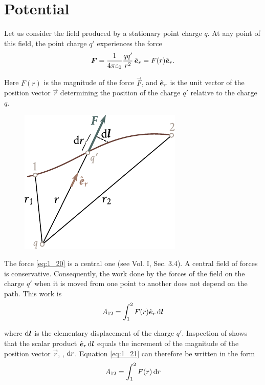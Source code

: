 \section{Potential}\label{sec:1_6}

Let us consider the field produced by a stationary point charge $q$. At any point of this field, the point charge $q'$ experiences the force
\begin{equation}\label{eq:1_20}
	\boldsymbol{F} = \frac{1}{4\pi\varepsilon_0}\frac{qq'}{r^2}\, \hat{\boldsymbol{e}}_{r} = F(r)\hat{\boldsymbol{e}}_{r}.
\end{equation}

\noindent
Here $F(r)$ is the magnitude of the force $\vec{F}$, and $\hat{\boldsymbol{e}}_{r}$ is the unit vector of the position vector $\vec{r}$ determining the position of the charge $q'$ relative to the charge $q$.

\begin{figure}[t]
	\begin{center}
		\includegraphics[scale=1]{figures/ch_01/fig_1_7.pdf}
		\caption[]{}
		\label{fig:1_7}
	\end{center}
	\vspace{-0.8cm}
\end{figure}

The force \eqref{eq:1_20} is a central one (see Vol. I, Sec. 3.4). A central field of forces is conservative. Consequently, the work done by the forces of the field on the charge $q'$ when it is moved from one point to another does not depend on the path. This work is
\begin{equation}\label{eq:1_21}
	A_{12} = \int_1^2 F(r) \hat{\boldsymbol{e}}_{r}\, \mathrm{d}\boldsymbol{l}
\end{equation}

\noindent
where $\mathrm{d}\boldsymbol{l}$ is the elementary displacement of the charge $q'$. Inspection of  shows that the scalar product $\hat{\boldsymbol{e}}_{r}\,\mathrm{d}\boldsymbol{l}$ equals the increment of the magnitude of the position vector $\vec{r}$, \ie, $\mathrm{d} r$. Equation \eqref{eq:1_21} can therefore be written in the form
\begin{equation*}
	A_{12} = \int_1^2 F(r)\, \mathrm{d} r
\end{equation*}

